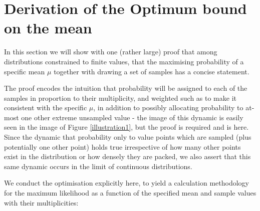 \documentclass[12pt]{colt2020} %
\begin{document}



\appendix

\section{Derivation of the Optimum bound on the mean}\label{appendix:derivation}

In this section we will show with one (rather large) proof that among distributions constrained to finite values, that the maximising probability of a specific mean $\mu$ together with drawing a set of samples has a concise statement. 

The proof encodes the intuition that probability will be assigned to each of the samples in proportion to their multiplicity, and weighted such as to make it consistent with the specific $\mu$, in addition to possibly allocating probability to at-most one other extreme unsampled value - the image of this dynamic is easily seen in the image of Figure \ref{illustration1}, but the proof is required and is here.
Since the dynamic that probability only to value points which are sampled (plus potentially one other point) holds true irrespective of how many other points exist in the distribution or how densely they are packed, we also assert that this same dynamic occurs in the limit of continuous distributions.

We conduct the optimisation explicitly here, to yield a calculation methodology for the maximum likelihood as a function of the specified mean and sample values with their multiplicities:
\end{document}
